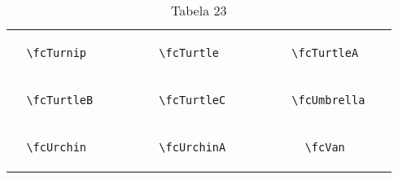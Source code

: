 \documentclass[x11names]{article}
\begin{document}
\begin{table}[H]
\begin{tabular}{|c|c|c|c|c|c|}
		&\multirow{5}{*}{	\fcTurnip	[scale=0.4]} & &\multirow{5}{*}{	\fcTurtle	[scale=0.8]} & &\multirow{5}{*}{	\fcTurtleA	[scale=0.8]}\\	& & & & & \\	& & & & & \\	\verb|	\fcTurnip	| & & \verb|	\fcTurtle	| & & \verb|	\fcTurtleA	| & \\	& & & & & \\	& & & & & \\	& & & & & \\	\hline									
		&\multirow{5}{*}{	\fcTurtleB	[scale=0.4]} & &\multirow{5}{*}{	\fcTurtleC	[scale=0.4]} & &\multirow{5}{*}{	\fcUmbrella	[scale=0.8]}\\	& & & & & \\	& & & & & \\	\verb|	\fcTurtleB	| & & \verb|	\fcTurtleC	| & & \verb|	\fcUmbrella	| & \\	& & & & & \\	& & & & & \\	& & & & & \\	\hline									
		&\multirow{5}{*}{	\fcUrchin	[scale=0.4]} & &\multirow{5}{*}{	\fcUrchinA	[scale=0.4]} & &\multirow{5}{*}{	\fcVan	[scale=0.8]}\\	& & & & & \\	& & & & & \\	\verb|	\fcUrchin	| & & \verb|	\fcUrchinA	| & & \verb|	\fcVan	| & \\	& & & & & \\	& & & & & \\	& & & & & \\		\hline 	\hline 	\end{tabular}	\caption{	Tabela 23	}\label{	Tab23	}\end{table}
\end{document}
